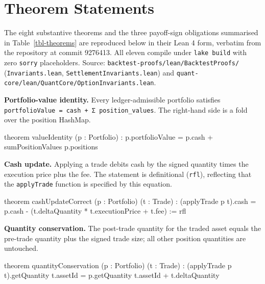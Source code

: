 \documentclass[
  11pt,
  letterpaper,
  DIV=12,
  numbers=noendperiod]{scrartcl}
\newenvironment{Shaded}{\begin{snugshade}}{\end{snugshade}}
\newcommand{\NormalTok}[1]{\textcolor[rgb]{0.00,0.23,0.31}{#1}}
\numberwithin{equation}{section}
\numberwithin{figure}{section}
\numberwithin{table}{section}
\let\quantproofsoldsection\section
\renewcommand{\section}{\clearpage\quantproofsoldsection}
\begin{document}
\section{Theorem Statements}\label{sec-appendix-theorems}

The eight substantive theorems and the three payoff-sign obligations
summarised in Table~\ref{tbl-theorems} are reproduced below in their
Lean 4 form, verbatim from the repository at commit 9276413. All eleven
compile under \texttt{lake\ build} with zero \texttt{sorry}
placeholders. Source: \texttt{backtest-proofs/lean/BacktestProofs/}
(\texttt{Invariants.lean}, \texttt{SettlementInvariants.lean}) and
\texttt{quant-core/lean/QuantCore/OptionInvariants.lean}.

\textbf{Portfolio-value identity.} Every ledger-admissible portfolio
satisfies \texttt{portfolioValue\ =\ cash\ +\ Σ\ position\_values}. The
right-hand side is a fold over the position HashMap.

\begin{Shaded}
\begin{Highlighting}[]
\NormalTok{theorem valueIdentity (p : Portfolio) :}
\NormalTok{    p.portfolioValue = p.cash + sumPositionValues p.positions}
\end{Highlighting}
\end{Shaded}

\textbf{Cash update.} Applying a trade debits cash by the signed
quantity times the execution price plus the fee. The statement is
definitional (\texttt{rfl}), reflecting that the \texttt{applyTrade}
function is specified by this equation.

\begin{Shaded}
\begin{Highlighting}[]
\NormalTok{theorem cashUpdateCorrect (p : Portfolio) (t : Trade) :}
\NormalTok{    (applyTrade p t).cash =}
\NormalTok{      p.cash {-} (t.deltaQuantity * t.executionPrice + t.fee) := rfl}
\end{Highlighting}
\end{Shaded}

\textbf{Quantity conservation.} The post-trade quantity for the traded
asset equals the pre-trade quantity plus the signed trade size; all
other position quantities are untouched.

\begin{Shaded}
\begin{Highlighting}[]
\NormalTok{theorem quantityConservation (p : Portfolio) (t : Trade) :}
\NormalTok{    (applyTrade p t).getQuantity t.assetId =}
\NormalTok{      p.getQuantity t.assetId + t.deltaQuantity}
\end{Highlighting}
\end{Shaded}
\end{document}
